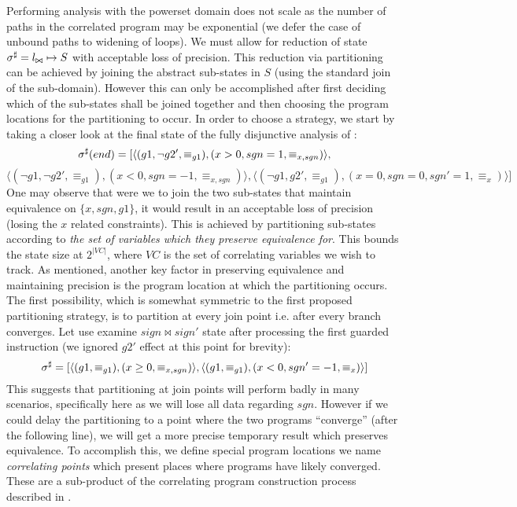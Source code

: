 Performing analysis with the powerset domain does not scale as the number of paths in the correlated program may be exponential (we defer the case of unbound paths to widening of loops). We must allow for reduction of state $\sigma^\sharp = l_{\bowtie} \mapsto S$ with acceptable loss of precision. This reduction via partitioning can be achieved by joining the abstract sub-states in $S$ (using the standard join of the sub-domain). However this can only be accomplished after first deciding which of the sub-states shall be joined together and then choosing the program locations for the partitioning to occur. In order to choose a strategy, we start by taking a closer look at the final state of the fully disjunctive analysis of :
{\footnotesize
\[
\sigma^\sharp(end) = [ \langle (g1,\neg g2',\equiv_{g1}),(x>0,sgn=1,\equiv_{x,sgn}) \rangle,
\]
\[
\langle (\neg g1,\neg g2',\equiv_{g1}), (x<0,sgn=-1,\equiv_{x,sgn}) \rangle,
\langle (\neg g1,g2',\equiv_{g1}),(x=0,sgn=0,sgn'=1,\equiv_{x}) \rangle ]
\]
}
One may observe that were we to join the two sub-states that maintain equivalence on $\{x,sgn,g1\}$, it would result in an acceptable loss of precision (losing the $x$ related constraints). This is achieved by partitioning sub-states according to \emph{the set of variables which they preserve equivalence for}. This bounds the state size at $2^{|VC|}$, where $VC$ is the set of correlating variables we wish to track.
As mentioned, another key factor in preserving equivalence and maintaining precision is the program location at which the partitioning occurs. The first possibility, which is somewhat symmetric to the first proposed partitioning strategy, is to partition at every join point i.e. after every branch converges. Let use examine $sign \bowtie sign'$ state after processing the first guarded instruction  (we ignored $g2'$ effect at this point for brevity):
{\footnotesize
\[
\sigma^\sharp = [ \langle (g1,\equiv_{g1}),(x \geq 0,\equiv_{x,sgn}) \rangle,
\langle (g1,\equiv_{g1}),(x < 0,sgn' = -1, \equiv_{x}) \rangle ]
\]
}
This suggests that partitioning at join points will perform badly in many scenarios, specifically here as we will lose all data regarding $sgn$. However if we could delay the partitioning to a point where the two programs ``converge'' (after the following  line), we will get a more precise temporary result which preserves equivalence. To accomplish this, we define special program locations we name \emph{correlating points} which present places where programs have likely converged. These are a sub-product of the correlating program construction process described in .

